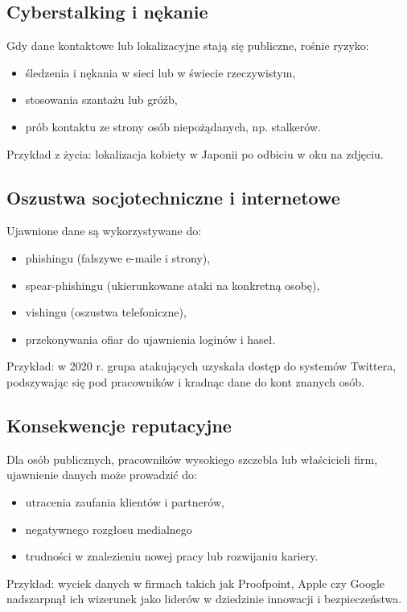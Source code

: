 \subsection{Cyberstalking i nękanie}
Gdy dane kontaktowe lub lokalizacyjne stają się publiczne, rośnie ryzyko:
\begin{itemize}
\item śledzenia i nękania w sieci lub w świecie rzeczywistym,
\item stosowania szantażu lub gróźb,
\item prób kontaktu ze strony osób niepożądanych, np. stalkerów.
\end{itemize}
Przykład z życia: lokalizacja kobiety w Japonii po odbiciu w oku na zdjęciu.

\subsection{Oszustwa socjotechniczne i internetowe}
Ujawnione dane są wykorzystywane do:
\begin{itemize}
\item phishingu (fałszywe e-maile i strony),
\item spear-phishingu (ukierunkowane ataki na konkretną osobę),
\item vishingu (oszustwa telefoniczne),
\item przekonywania ofiar do ujawnienia loginów i haseł.
\end{itemize}

Przykład: w 2020 r. grupa atakujących uzyskała dostęp do systemów Twittera, podszywając się pod pracowników i kradnąc dane do kont znanych osób.

\subsection{Konsekwencje reputacyjne}
Dla osób publicznych, pracowników wysokiego szczebla lub właścicieli firm, ujawnienie danych może prowadzić do:
\begin{itemize}
\item utracenia zaufania klientów i partnerów,
\item negatywnego rozgłosu medialnego
\item trudności w znalezieniu nowej pracy lub rozwijaniu kariery.
\end{itemize}

Przykład: wyciek danych w firmach takich jak Proofpoint, Apple czy Google nadszarpnął ich wizerunek jako liderów w dziedzinie innowacji i bezpieczeństwa.

